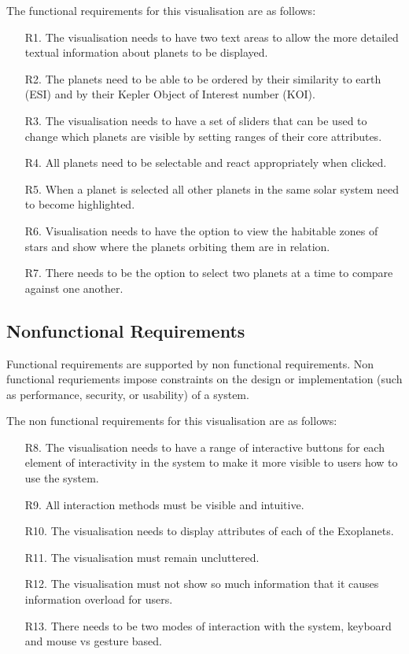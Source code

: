 The functional requirements for this visualisation are as follows:
\begin{enumerate}

 \item[R1.] The visualisation needs to have two text areas to allow the more detailed textual information about planets to be displayed.
 \item[R2.] The planets need to be able to be ordered by their similarity to earth (ESI) and by their Kepler Object of Interest number (KOI).
 \item[R3.] The visualisation needs to have a set of sliders that can be used to change which planets are visible by setting ranges of their core attributes.
 \item[R4.] All planets need to be selectable and react appropriately when clicked.
 \item[R5.] When a planet is selected all other planets in the same solar system need to become highlighted.
 \item[R6.] Visualisation needs to have the option to view the habitable zones of stars and show where the planets orbiting them are in relation.
 \item[R7.] There needs to be the option to select two planets at a time to compare against one another.
\end{enumerate}


\subsection{Nonfunctional Requirements}
 Functional requirements are supported by non functional requirements. Non functional requriements impose constraints on the design or implementation (such as performance, security, or usability) of a system.
 
 The non functional requirements for this visualisation are as follows:
\begin{enumerate}
 \item[R8.] The visualisation needs to have a range of interactive buttons for each element of interactivity in the system to make it more visible to users how to use the system.
 \item[R9.] All interaction methods must be visible and intuitive.
 \item[R10.] The visualisation needs to display attributes of each of the Exoplanets.
 \item[R11.] The visualisation must remain uncluttered.
 \item[R12.] The visualisation must not show so much information that it causes information overload for users.
  \item[R13.] There needs to be two modes of interaction with the system, keyboard and mouse vs gesture based.
\end{enumerate}

